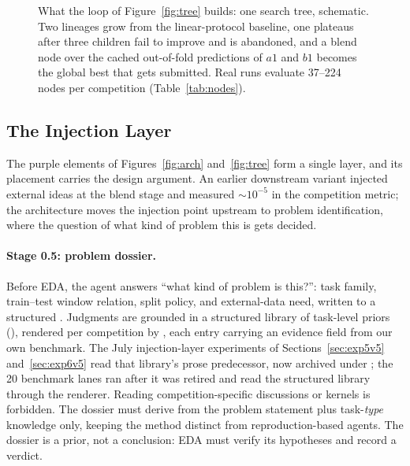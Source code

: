 \documentclass[11pt,a4paper]{article}
\begin{document}
\begin{figure}[htbp]
\caption{What the loop of Figure~\ref{fig:tree} builds: one search tree, schematic. Two
lineages grow from the linear-protocol baseline, one plateaus after three children fail to
improve and is abandoned, and a blend node over the cached out-of-fold predictions of $a1$ and
$b1$ becomes the global best that gets submitted. Real runs evaluate 37--224 nodes per
competition (Table~\ref{tab:nodes}).}
\label{fig:treeex}
\end{figure}

\subsection{The Injection Layer}
\label{sec:v5}

The purple elements of Figures~\ref{fig:arch} and~\ref{fig:tree} form a single layer, and its placement carries the design argument. An earlier downstream variant injected external ideas at the blend stage and measured ${\sim}10^{-5}$ in the competition metric; the architecture moves the injection point upstream to problem identification, where the question of what kind of problem this is gets decided.

\paragraph{Stage 0.5: problem dossier.} Before EDA, the agent answers ``what kind of problem is this?'': task family, train--test window relation, split policy, and external-data need, written to a structured . Judgments are grounded in a structured library of task-level priors (), rendered per competition by , each entry carrying an evidence field from our own benchmark. The July injection-layer experiments of Sections~\ref{sec:exp5v5} and~\ref{sec:exp6v5} read that library's prose predecessor, now archived under ; the 20 benchmark lanes ran after it was retired and read the structured library through the renderer. Reading competition-specific discussions or kernels is forbidden. The dossier must derive from the problem statement plus task-\emph{type} knowledge only, keeping the method distinct from reproduction-based agents. The dossier is a prior, not a conclusion: EDA must verify its hypotheses and record a verdict.
\end{document}
